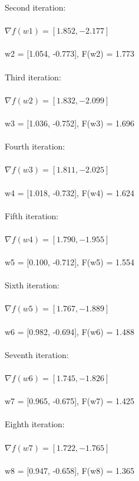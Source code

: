 \documentclass{article}
\begin{document}
\noindent Second iteration: \\ \\
$\nabla f(w1)= [1.852,-2.177]$ \\ \\
w2 = [1.054, -0.773], F(w2) = 1.773 \\ \\

\noindent Third iteration: \\ \\
$\nabla f(w2)= [1.832,-2.099]$ \\ \\
w3 = [1.036, -0.752], F(w3) = 1.696 \\ \\

\noindent Fourth iteration: \\ \\
$\nabla f(w3)= [1.811,-2.025]$ \\ \\
w4 = [1.018, -0.732], F(w4) = 1.624 \\ \\

\noindent Fifth iteration: \\ \\
$\nabla f(w4)= [1.790,-1.955]$ \\ \\
w5 = [0.100, -0.712], F(w5) = 1.554 \\ \\

\noindent Sixth iteration: \\ \\
$\nabla f(w5)= [1.767,-1.889]$ \\ \\
w6 = [0.982, -0.694], F(w6) = 1.488 \\ \\

\noindent Seventh iteration: \\ \\
$\nabla f(w6)= [1.745,-1.826]$ \\ \\
w7 = [0.965, -0.675], F(w7) = 1.425 \\ \\

\noindent Eighth iteration: \\ \\
$\nabla f(w7)= [1.722,-1.765]$ \\ \\
w8 = [0.947, -0.658], F(w8) = 1.365 \\ \\
\end{document}

